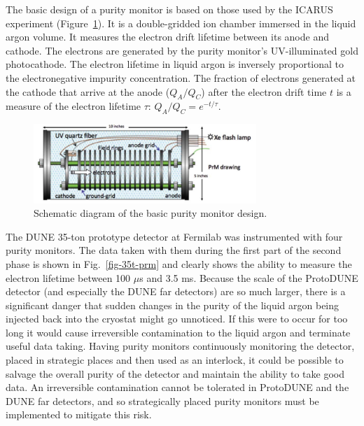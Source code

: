 The basic design of a purity monitor is based on those used by the ICARUS experiment (Figure~\ref{fig:prm}). It is a double-gridded ion chamber immersed in the liquid argon volume. It measures the electron drift lifetime between its anode and cathode. The electrons are generated by the purity monitor's UV-illuminated gold photocathode. The electron lifetime in liquid argon is inversely proportional to the electronegative impurity concentration. The fraction of electrons generated at the cathode that arrive at the anode ($Q_A/Q_C$) after the electron drift time $t$ is a measure of the electron lifetime $\tau$: $Q_A/Q_C=e^{-t/\tau}$.

\begin{figure}[h]
\centering
\includegraphics[height=3cm]{figures/PrMon_prm.pdf}
\caption{Schematic diagram of the basic purity monitor design.}\label{fig:prm}
\end{figure}

The DUNE 35-ton prototype detector at Fermilab was instrumented with four purity monitors. The data taken with them during the first part of the second phase is shown in Fig.~\ref{fig-35t-prm} and clearly shows the ability to measure the electron lifetime between 100 $\mu$s and 3.5 ms.  Because the scale of the ProtoDUNE detector (and especially the DUNE far detectors) are so much larger, there is a significant danger that sudden changes in the purity of the liquid argon being injected back into the cryostat might go unnoticed. If this were to occur for too long it would cause irreversible contamination to the liquid argon and terminate useful data taking.  Having purity monitors continuously monitoring the detector, placed in strategic places and then used as an interlock, it could be possible to salvage the overall purity of the detector and maintain the ability to take good data. An irreversible contamination cannot be tolerated in ProtoDUNE and the DUNE far detectors, and so strategically placed purity monitors must be implemented to mitigate this risk. 



